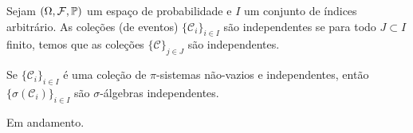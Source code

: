 \begin{definicao}
Sejam $(\Omega,\mathcal{F},\mathbb{P})$ um espaço de probabilidade e 
$I$ um conjunto de índices arbitrário.  
As coleções (de eventos) $\{\mathcal{C}_i\}_{i\in I}$
são independentes se para todo $J\subset I$ finito,
temos que as coleções $\{\mathcal{C}\}_{j\in J}$
são independentes.
\end{definicao}




\begin{corolario}
	Se $\{\mathcal{C}_i\}_{i\in I}$ é uma coleção 
	de $\pi$-sistemas não-vazios e independentes, 
	então $\{\sigma(\mathcal{C}_i)\}_{i\in I}$ são
	$\sigma$-álgebras independentes.
\end{corolario}



\begin{center}
	{\red Em andamento.}
\end{center}


